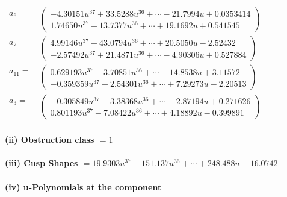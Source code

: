 \documentclass[1p]{elsarticle_modified}
\theoremstyle{definition}
\begin{document}
\begin{tabular}{m{7pt} m{180pt} m{7pt} m{180pt} }
\flushright $a_{6}=$&$\begin{pmatrix}-4.30151 u^{37}+33.5288 u^{36}+\cdots-21.7994 u+0.0353414\\1.74650 u^{37}-13.7377 u^{36}+\cdots+19.1692 u+0.541545\end{pmatrix}$ \\
\flushright $a_{7}=$&$\begin{pmatrix}4.99146 u^{37}-43.0794 u^{36}+\cdots+20.5050 u-2.52432\\-2.57492 u^{37}+21.4871 u^{36}+\cdots-4.90306 u+0.527884\end{pmatrix}$ \\
\flushright $a_{11}=$&$\begin{pmatrix}0.629193 u^{37}-3.70851 u^{36}+\cdots-14.8538 u+3.11572\\-0.359359 u^{37}+2.54301 u^{36}+\cdots+7.29273 u-2.20513\end{pmatrix}$ \\
\flushright $a_{3}=$&$\begin{pmatrix}-0.305849 u^{37}+3.38368 u^{36}+\cdots-2.87194 u+0.271626\\0.801193 u^{37}-7.08422 u^{36}+\cdots+4.18892 u-0.399891\end{pmatrix}$\\&\end{tabular}
\flushleft \textbf{(ii) Obstruction class $= 1$}\\~\\
\flushleft \textbf{(iii) Cusp Shapes $= 19.9303 u^{37}-151.137 u^{36}+\cdots+248.488 u-16.0742$}\\~\\
\newpage\renewcommand{\arraystretch}{1}
\flushleft \textbf{(iv) u-Polynomials at the component}\newline \\
\end{document}
